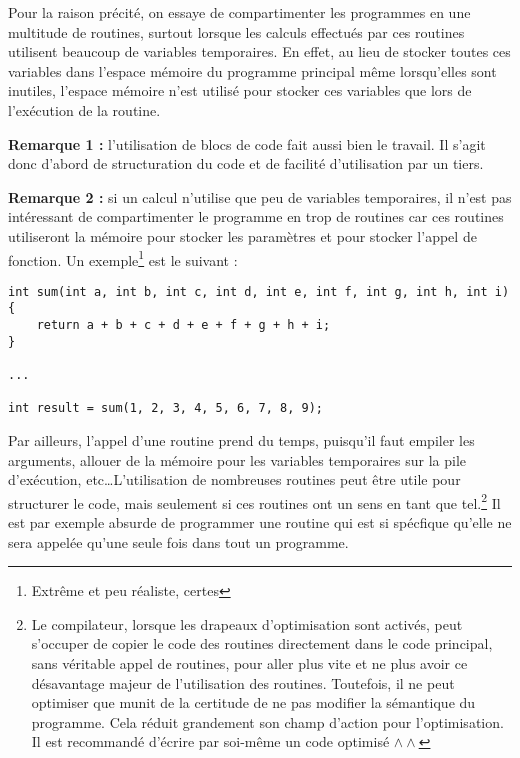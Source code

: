 \documentclass[../../../main.tex]{subfiles}
\begin{document}
Pour la raison précité, on essaye de compartimenter les programmes en une multitude de routines, surtout lorsque les calculs effectués par ces routines utilisent beaucoup de variables temporaires. En effet, au lieu de stocker toutes ces variables dans l'espace mémoire du programme principal même lorsqu'elles sont inutiles, l'espace mémoire n'est utilisé pour stocker ces variables que lors de l'exécution de la routine.

\textbf{Remarque 1 :} l'utilisation de blocs de code fait aussi bien le travail. Il s'agit donc d'abord de structuration du code et de facilité d'utilisation par un tiers.

\textbf{Remarque 2 :} si un calcul n'utilise que peu de variables temporaires, il n'est pas intéressant de compartimenter le programme en trop de routines car ces routines utiliseront la mémoire pour stocker les paramètres et pour stocker l'appel de fonction. Un exemple\footnote{Extrême et peu réaliste, certes} est le suivant :
\begin{verbatim}
int sum(int a, int b, int c, int d, int e, int f, int g, int h, int i) {
	return a + b + c + d + e + f + g + h + i;
}

...

int result = sum(1, 2, 3, 4, 5, 6, 7, 8, 9);
\end{verbatim}

Par ailleurs, l'appel d'une routine prend du temps, puisqu'il faut empiler les arguments, allouer de la mémoire pour les variables temporaires sur la pile d'exécution, etc\dots L'utilisation de nombreuses routines peut être utile pour structurer le code, mais seulement si ces routines ont un sens en tant que tel.\footnote{Le compilateur, lorsque les drapeaux d'optimisation sont activés, peut s'occuper de copier le code des routines directement dans le code principal, sans véritable appel de routines, pour aller plus vite et ne plus avoir ce désavantage majeur de l'utilisation des routines. Toutefois, il ne peut optimiser que munit de la certitude de ne pas modifier la sémantique du programme. Cela réduit grandement son champ d'action pour l'optimisation. Il est recommandé d'écrire par soi-même un code optimisé $\wedge\wedge$} Il est par exemple absurde de programmer une routine qui est si spécfique qu'elle ne sera appelée qu'une seule fois dans tout un programme.
\end{document}
